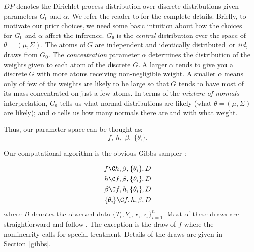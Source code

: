 $DP$ denotes the Dirichlet process distribution over discrete
distributions given parameters $G_0$ and $\alpha$.  We refer the
reader to \cite{CHMR08} for the complete details.  Briefly, to
motivate our prior choices, we need some basic intuition about how the
choices for $G_0$ and $\alpha$ affect the inference.  $G_0$ is the
{\it central} distribution over the space of $\theta=(\mu,\Sigma)$.
The atoms of $G$ are independent and identically distributed, 
or {\it iid}, draws from $G_0$.  The {\it concentration}
parameter $\alpha$ determines the distribution of the weights given to
each atom of the discrete $G$.  A larger $\alpha$ tends to give you a
discrete $G$ with more atoms receiving non-negligible weight.  A
smaller $\alpha$ means only of few of the weights are likely to be
large so that $G$ tends to have most of its mass concentrated on just
a few atoms.  In terms of the {\it mixture of normals} interpretation,
$G_0$ tells us what normal distributions are likely (what
$\theta = (\mu,\Sigma)$ are likely); and $\alpha$ tells us how many
normals there are and with what weight.

Thus, our parameter space can be thought as:
$$
f,\; h,\; \beta,\; \{\theta_i\}.
$$

Our computational algorithm is the obvious Gibbs sampler
\citep{GelfSmit90}:

\begin{eqnarray}\label{gibbs}
f \C h,\beta,\{\theta_i\},D \label{gibbsf} \\
h \C f,\beta,\{\theta_i\},D \label{gibbsh} \\
\beta \C f,h,\{\theta_i\},D \label{gibbsb} \\
\{\theta_i\} \C f,h,\beta,D \label{gibbsb} \\
\end{eqnarray}
where $D$ denotes the observed data $\{T_i,Y_i,x_i,z_i\}_{i=1}^n$.
Most of these draws are straightforward and follow \cite{CHMR08}.
The exception is the draw of $f$ where the nonlinearity calls for special treatment.
Details of the draws are given in Section~\ref{gibbs}.



